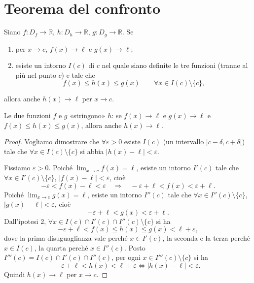 \documentclass[11pt,a4paper]{article}
\begin{document}
\section{Teorema del confronto}

\begin{teorema}
Siano $f : D_f \to \mathbb{R}$, $h : D_h \to \mathbb{R}$, $g : D_g \to \mathbb{R}$. Se
\begin{enumerate}
  \item per $x \to c$, $f(x) \to \ell$ e $g(x) \to \ell$;
  \item esiste un intorno $I(c)$ di $c$ nel quale siano definite le tre funzioni (tranne al più nel punto $c$) e tale che
  \[
    f(x) \le h(x) \le g(x) \qquad \forall x \in I(c)\setminus\{c\},
  \]
\end{enumerate}
allora anche $h(x) \to \ell$ per $x \to c$.
\end{teorema}

Le due funzioni $f$ e $g$ «stringono» $h$: se $f(x) \to \ell$ e $g(x) \to \ell$ e $f(x) \le h(x) \le g(x)$, allora anche $h(x) \to \ell$.

\begin{proof}
Vogliamo dimostrare che $\forall\varepsilon > 0$ esiste $I(c)$ (un intervallo $]c - \delta, c + \delta[$) tale che $\forall x \in I(c)\setminus\{c\}$ si abbia $|h(x) - \ell| < \varepsilon$.

Fissiamo $\varepsilon > 0$. Poiché $\displaystyle\lim_{x\to c} f(x) = \ell$, esiste un intorno $I'(c)$ tale che $\forall x \in I'(c)\setminus\{c\}$, $|f(x) - \ell| < \varepsilon$, cioè
\[
  -\varepsilon < f(x) - \ell < \varepsilon \quad\Longrightarrow\quad -\varepsilon + \ell < f(x) < \varepsilon + \ell .
\]
Poiché $\displaystyle\lim_{x\to c} g(x) = \ell$, esiste un intorno $I''(c)$ tale che $\forall x \in I''(c)\setminus\{c\}$, $|g(x) - \ell| < \varepsilon$, cioè
\[
  -\varepsilon + \ell < g(x) < \varepsilon + \ell .
\]
Dall'ipotesi 2, $\forall x \in I(c)\cap I'(c)\cap I''(c)\setminus\{c\}$ si ha
\[
  -\varepsilon + \ell < f(x) \le h(x) \le g(x) < \ell + \varepsilon ,
\]
dove la prima disuguaglianza vale perché $x \in I'(c)$, la seconda e la terza perché $x \in I(c)$, la quarta perché $x \in I''(c)$. Posto $I'''(c) = I(c)\cap I'(c)\cap I''(c)$, per ogni $x \in I'''(c)\setminus\{c\}$ si ha
\[
  -\varepsilon + \ell < h(x) < \ell + \varepsilon \iff |h(x) - \ell| < \varepsilon .
\]
Quindi $h(x) \to \ell$ per $x \to c$.
\end{proof}
\end{document}
